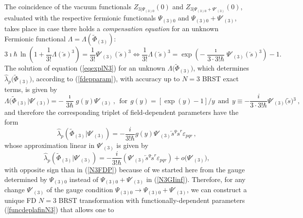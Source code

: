 \documentclass[10pt]{article}
\begin{document}
The coincidence of the vacuum functionals $Z_{3|\Psi_{(3)0}}(0)$ and
$Z_{3|\Psi_{(3)0}+\Psi'_{(3)}}(0)$, evaluated with the respective fermionic
functionals $\Psi_{(3)0}$ and $\Psi_{(3)0}+\Psi'_{(3)}$, takes
place in case there holds a \emph{compensation equation}
for an unknown Fermionic functional $\Lambda=\Lambda(\widetilde{\Phi}_{(3)})$:
\begin{equation}
3\imath\hbar\,\mathrm{\ln}\left(
1+\frac{1}{3!}\Lambda (\overleftarrow{s})^{3}\right)
=\frac{1}{3!} \Psi'_{(3)} (\overleftarrow{s})^{3}  \Longleftrightarrow  \frac{1}{3!}\Lambda(\overleftarrow{s})^{3}=\exp\left(  -{\frac{\imath}{3\cdot 3!\hbar}%
} \Psi'_{(3)}(\overleftarrow{s})^{3}\right)-1 .
\label{eqexplN3}%
\end{equation}
The solution of equation (\ref{eqexplN3}) for an unknown  $\Lambda\big(
\widetilde{\Phi}_{(3)}\big)  $, which determines
$\hat{\lambda}_{p}\big(  \widetilde{\Phi}_{(3)}\big)  $,
according to (\ref{fdepparam}), with accuracy up to $N=3$ BRST exact terms, is given by%
\begin{equation}
\Lambda\big(\widetilde{\Phi}_{(3)}|\Psi'_{(3)}\big)=-\frac{\imath}{3\hbar}g(y)\Psi'_{(3)}\ ,\ \ \mathrm{for}%
\ \ g(y)=\left[  \exp(y)-1\right]  /y\ \ \mathrm{and}\ \ y\equiv-\frac
{i}{3\cdot3!\hbar}\Psi'_{(3)}\big(\overleftarrow{s}\big){}^{3}\ , \label{solcompeq3}%
\end{equation}
and therefore the corresponding triplet of field-dependent parameters have the form%
\begin{equation}
\hat{\lambda}_{p}\left( \widetilde{\Phi}_{(3)}|\Psi'_{(3)}\right)  = - \frac{i}{3!\hbar}g(y)
\Psi'_{(3)}\overleftarrow{s}^q\overleftarrow{s}^r \varepsilon_{pqr}  \, , \label{funcdeplafinN3}%
\end{equation}
whose approximation linear in $\Psi'_{(3)}$ is given    by
\begin{equation}
\hat{\lambda}_{p}\left(\widetilde{\Phi}_{(3)} |\Psi'_{(3)} \right)  =- \frac{i}{3!\hbar}\left(
\Psi'_{(3)}\overleftarrow{s}^q\overleftarrow{s}^r \varepsilon_{pqr} \right)  + {o}\big(\Psi'_{(3)}\big) ,
\label{funcdeplainfN3}%
\end{equation}
with opposite sign than in (\ref{N3FDP}) because of we  started here  from the gauge determined by $\Psi_{(3)0}$ instead of $\Psi_{(3)0}+\Psi'_{(3)}$  in (\ref{N3GIinf}).
Therefore, for any change $\Psi'_{(3)}$ of the gauge condition $\Psi_{(3)0}\to \Psi_{(3)0}+  \Psi'_{(3)}$,
we can construct a unique FD $N=3$ BRST transformation
with functionally-dependent parameters (\ref{funcdeplafinN3}) that allows one to
\end{document}
